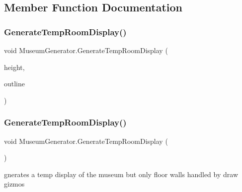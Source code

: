 \subsection{Member Function Documentation}
\mbox{\label{class_museum_generator_a65ac409691646fa2f92ee9b84294ac57}} 
\subsubsection{\texorpdfstring{Generate\+Temp\+Room\+Display()}{GenerateTempRoomDisplay()}\hspace{0.1cm}{\footnotesize\ttfamily [1/2]}}
{\footnotesize\ttfamily void Museum\+Generator.\+Generate\+Temp\+Room\+Display (\begin{DoxyParamCaption}\item[{int}]{height,  }\item[{Hash\+Set$<$ int $>$}]{outline }\end{DoxyParamCaption})\hspace{0.3cm}{\ttfamily [private]}}

\mbox{\label{class_museum_generator_a1b9419222535f317005ca9fe1fe757f3}} 
\subsubsection{\texorpdfstring{Generate\+Temp\+Room\+Display()}{GenerateTempRoomDisplay()}\hspace{0.1cm}{\footnotesize\ttfamily [2/2]}}
{\footnotesize\ttfamily void Museum\+Generator.\+Generate\+Temp\+Room\+Display (\begin{DoxyParamCaption}{ }\end{DoxyParamCaption})\hspace{0.3cm}{\ttfamily [private]}}



gnerates a temp display of the museum but only floor walls handled by draw gizmos 

